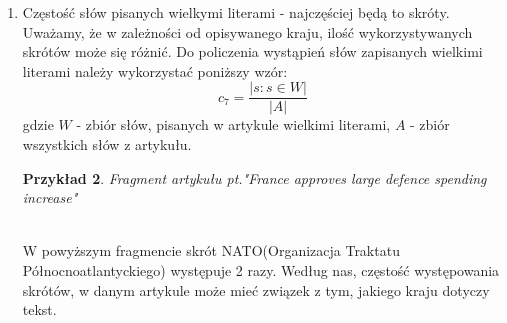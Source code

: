 \documentclass{classrep}
\newtheorem{exmp}{Przykład}[section]
\begin{document}
\begin{enumerate}
\begin{equation}
    \end{equation}
    gdzie $Z$ - zbiór słów, rozpoczynających się w arrtykule wielką literą, $A$ - zbiór wszystkich słów z artykułu, $W$ - zbiór słów, pisanych w artykule wielkimi literami, $M$ - zbiór słów, które rozpoczynają w artykule zdania. \\
	\begin{exmp}Fragment artykułu pt. "U.S. Auto Union will fight to stop job/wage cuts" \cite{reuters}\\
	. \\
    \end{exmp}
    W tym krótkim fragmencie występuje aż 9 słów rozpoczynających się wielką literą, jednocześnie nie będących pierwszym słowem w zdaniu oraz nie będących słowem składających się tylko z wielkich liter. Słowa te są w tym fragmencie związane z nazwami własnymi oraz nazwą miesiąca. Uważamy, że przede wszystkim stosowanie nazw własnych może być związane z tym, z jakiego kraju pochodzi podany dokument. \\
    \item Częstość słów pisanych wielkymi literami - najczęściej będą to skróty. Uważamy, że w zależności od opisywanego kraju, ilość wykorzystywanych skrótów może się różnić. Do policzenia wystąpień słów zapisanych wielkimi literami należy wykorzystać poniższy wzór:
    \begin{equation}
        c_7 = \frac{|{s: s \in W}|}{|A|}
    \end{equation}
    gdzie $W$ - zbiór słów, pisanych w artykule wielkimi literami, $A$ - zbiór wszystkich słów z artykułu. \\ 
    \begin{exmp}Fragment artykułu pt."France approves large defence spending increase" \cite{reuters} \\
     \\
    \end{exmp}
    W powyższym fragmencie skrót NATO(Organizacja Traktatu Północnoatlantyckiego) występuje 2 razy. Według nas, częstość występowania skrótów, w danym artykule może mieć związek z tym, jakiego kraju dotyczy tekst. \\

\end{enumerate}
\end{document}
